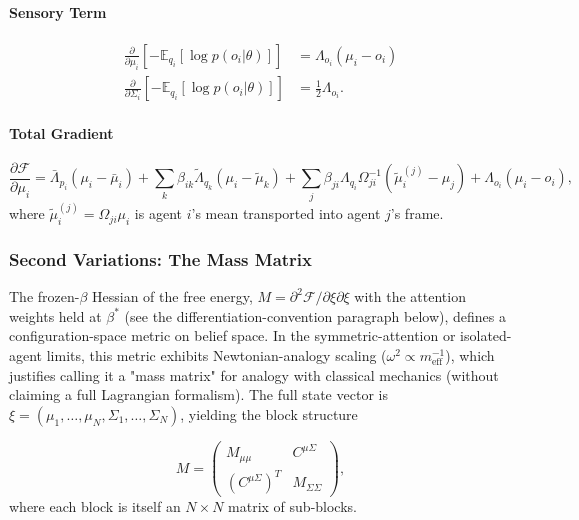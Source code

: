 \documentclass[11pt]{article}
\begin{document}
\paragraph{Sensory Term}
\begin{align}
\frac{\partial}{\partial \mu_i}\left[-\mathbb{E}_{q_i}[\log p(o_i | \theta)]\right] &= \Lambda_{o_i}(\mu_i - o_i) \\
\frac{\partial}{\partial \Sigma_i}\left[-\mathbb{E}_{q_i}[\log p(o_i | \theta)]\right] &= \frac{1}{2}\Lambda_{o_i}.
\end{align}

\paragraph{Total Gradient}
\begin{equation}
\frac{\partial \mathcal{F}}{\partial \mu_i} = \bar{\Lambda}_{p_i}(\mu_i - \bar{\mu}_i) + \sum_k \beta_{ik}\tilde{\Lambda}_{q_k}(\mu_i - \tilde{\mu}_k) + \sum_j \beta_{ji}\Lambda_{q_i}\Omega_{ji}^{-1}(\tilde{\mu}_i^{(j)} - \mu_j) + \Lambda_{o_i}(\mu_i - o_i),
\label{eq:total_gradient_mu}
\end{equation}
where $\tilde{\mu}_i^{(j)} = \Omega_{ji}\mu_i$ is agent $i$'s mean transported into agent $j$'s frame.

\subsubsection{Second Variations: The Mass Matrix}

The frozen-$\beta$ Hessian of the free energy, $M = \partial^2 \mathcal{F}/\partial\xi\partial\xi$ with the attention weights held at $\beta^*$ (see the differentiation-convention paragraph below), defines a configuration-space metric on belief space. In the symmetric-attention or isolated-agent limits, this metric exhibits Newtonian-analogy scaling ($\omega^2 \propto m_{\text{eff}}^{-1}$), which justifies calling it a "mass matrix" for analogy with classical mechanics (without claiming a full Lagrangian formalism). The full state vector is $\xi = (\mu_1, \ldots, \mu_N, \Sigma_1, \ldots, \Sigma_N)$, yielding the block structure

\begin{equation}
M = \begin{pmatrix} M_{\mu\mu} & C^{\mu\Sigma} \\ (C^{\mu\Sigma})^T & M_{\Sigma\Sigma} \end{pmatrix},
\label{eq:mass_block_structure}
\end{equation}
where each block is itself an $N \times N$ matrix of sub-blocks.
\end{document}
